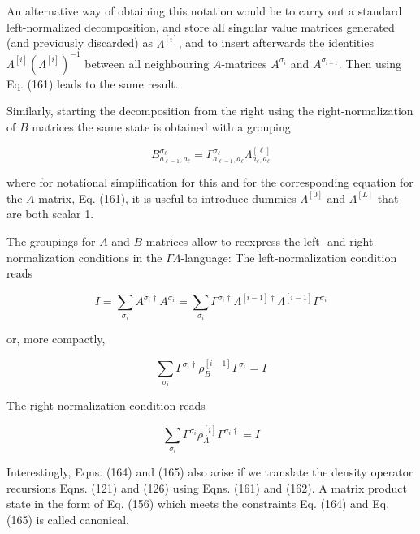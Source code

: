 \documentclass[12pt]{article}
\begin{document}
An alternative way of obtaining this notation would be to carry out a standard left-normalized decomposition, and store all singular value matrices generated (and previously discarded) as $\Lambda^{[i]}$, and to insert afterwards the identities $\Lambda^{[i]}\left(\Lambda^{[i]}\right)^{-1}$ between all neighbouring $A$-matrices $A^{\sigma_{i}}$ and $A^{\sigma_{i+1}}$. Then using Eq. (161) leads to the same result.

Similarly, starting the decomposition from the right using the right-normalization of $B$ matrices the same state is obtained with a grouping


\begin{equation*}
B_{a_{\ell-1}, a_{\ell}}^{\sigma_{\ell}}=\Gamma_{a_{\ell-1}, a_{\ell}}^{\sigma_{\ell}} \Lambda_{a_{\ell}, a_{\ell}}^{[\ell]} \tag{162}
\end{equation*}


where for notational simplification for this and for the corresponding equation for the $A$-matrix, Eq. (161), it is useful to introduce dummies $\Lambda^{[0]}$ and $\Lambda^{[L]}$ that are both scalar 1.

The groupings for $A$ and $B$-matrices allow to reexpress the left- and right-normalization conditions in the $\Gamma \Lambda$-language: The left-normalization condition reads


\begin{equation*}
I=\sum_{\sigma_{i}} A^{\sigma_{i} \dagger} A^{\sigma_{i}}=\sum_{\sigma_{i}} \Gamma^{\sigma_{i} \dagger} \Lambda^{[i-1] \dagger} \Lambda^{[i-1]} \Gamma^{\sigma_{i}} \tag{163}
\end{equation*}


or, more compactly,


\begin{equation*}
\sum_{\sigma_{i}} \Gamma^{\sigma_{i} \dagger} \rho_{B}^{[i-1]} \Gamma^{\sigma_{i}}=I \tag{164}
\end{equation*}


The right-normalization condition reads


\begin{equation*}
\sum_{\sigma_{i}} \Gamma^{\sigma_{i}} \rho_{A}^{[i]} \Gamma^{\sigma_{i} \dagger}=I \tag{165}
\end{equation*}


Interestingly, Eqns. (164) and (165) also arise if we translate the density operator recursions Eqns. (121) and (126) using Eqns. (161) and (162). A matrix product state in the form of Eq. (156) which meets the constraints Eq. (164) and Eq. (165) is called canonical.
\end{document}
